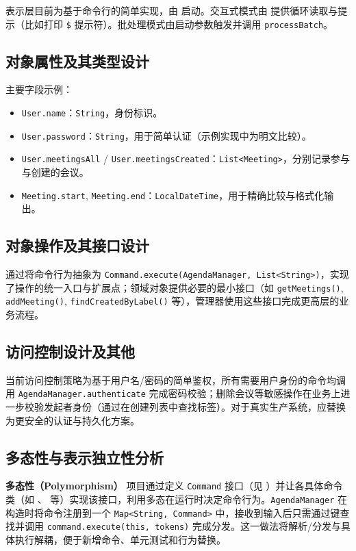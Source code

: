 表示层目前为基于命令行的简单实现，由  启动。交互式模式由  提供循环读取与提示（比如打印 \texttt{\$} 提示符）。批处理模式由启动参数触发并调用 \texttt{processBatch}。

\subsection{对象属性及其类型设计}

主要字段示例：
\begin{itemize}
  \item \texttt{User.name}：\texttt{String}，身份标识。
  \item \texttt{User.password}：\texttt{String}，用于简单认证（示例实现中为明文比较）。
  \item \texttt{User.meetingsAll} / \texttt{User.meetingsCreated}：\texttt{List<Meeting>}，分别记录参与与创建的会议。
  \item \texttt{Meeting.start}, \texttt{Meeting.end}：\texttt{LocalDateTime}，用于精确比较与格式化输出。
\end{itemize}

\subsection{对象操作及其接口设计}

通过将命令行为抽象为 \texttt{Command.execute(AgendaManager, List<String>)}，实现了操作的统一入口与扩展点；领域对象提供必要的最小接口（如 \texttt{getMeetings()}, \texttt{addMeeting()}, \texttt{findCreatedByLabel()} 等），管理器使用这些接口完成更高层的业务流程。

\subsection{访问控制设计及其他}

当前访问控制策略为基于用户名/密码的简单鉴权，所有需要用户身份的命令均调用 \texttt{AgendaManager.authenticate} 完成密码校验；删除会议等敏感操作在业务上进一步校验发起者身份（通过在创建列表中查找标签）。对于真实生产系统，应替换为更安全的认证与持久化方案。

\subsection{多态性与表示独立性分析}

\textbf{多态性（Polymorphism）}
项目通过定义 \texttt{Command} 接口（见 ）并让各具体命令类（如 、 等）实现该接口，利用多态在运行时决定命令行为。\texttt{AgendaManager} 在构造时将命令注册到一个 \texttt{Map<String, Command>} 中，接收到输入后只需通过键查找并调用 \texttt{command.execute(this, tokens)} 完成分发。这一做法将解析/分发与具体执行解耦，便于新增命令、单元测试和行为替换。

